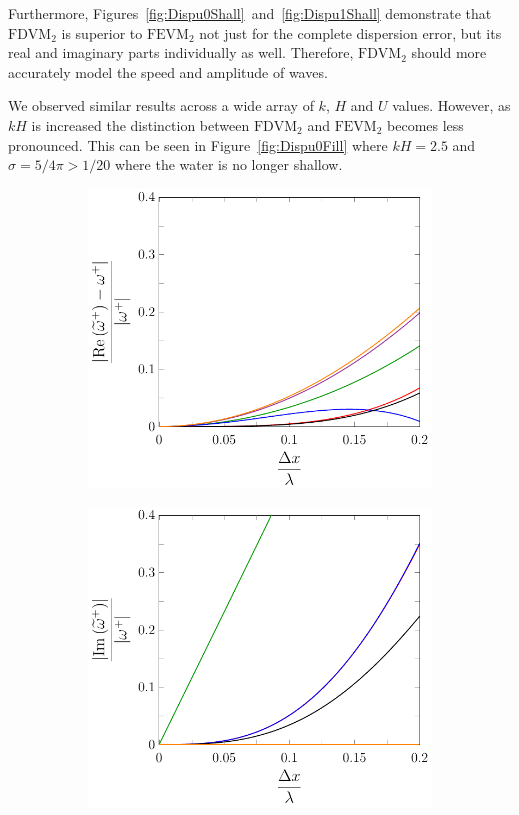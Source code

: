 Furthermore, Figures~\ref{fig:Dispu0Shall}~and~\ref{fig:Dispu1Shall} demonstrate that $\text{FDVM}_2$ is superior to $\text{FEVM}_2$ not just for the complete dispersion error, but its real and imaginary parts individually as well. Therefore, $\text{FDVM}_2$ should more accurately model the speed and amplitude of waves.

We observed similar results across a wide array of $k$, $H$ and $U$ values. However, as $kH$ is increased the distinction between $\text{FDVM}_2$ and $\text{FEVM}_2$ becomes less pronounced. This can be seen in Figure~\ref{fig:Dispu0Fill} where $kH = 2.5$ and $\sigma = 5/4 \pi > 1/20$ where the water is no longer shallow.
\begin{figure}
	\centering
	\begin{subfigure}{0.5\textwidth}
		\includegraphics[width=\textwidth]{./chp4/figures/New/ReDispu0Fill.pdf}
	\end{subfigure}%
	\begin{subfigure}{0.5\textwidth}
		\includegraphics[width=\textwidth]{./chp4/figures/New/ImDispu0Fill.pdf}

\end{subfigure}
\end{figure}
